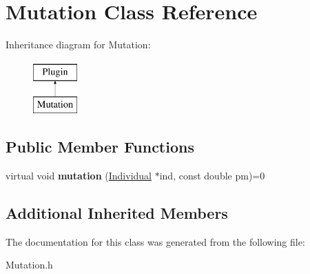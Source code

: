 \hypertarget{classMutation}{}\section{Mutation Class Reference}
\label{classMutation}
Inheritance diagram for Mutation\+:\begin{figure}[H]
\begin{center}
\leavevmode
\includegraphics[height=2.000000cm]{d9/df6/classMutation}
\end{center}
\end{figure}
\subsection*{Public Member Functions}
\begin{DoxyCompactItemize}
\item 
\mbox{\label{classMutation_a9a61940dc548404c7e6aa7a94ed8808a}} 
virtual void {\bfseries mutation} (\mbox{\hyperlink{classIndividual}{Individual}} $\ast$ind, const double pm)=0
\end{DoxyCompactItemize}
\subsection*{Additional Inherited Members}


The documentation for this class was generated from the following file\+:\begin{DoxyCompactItemize}
\item 
Mutation.\+h\end{DoxyCompactItemize}
